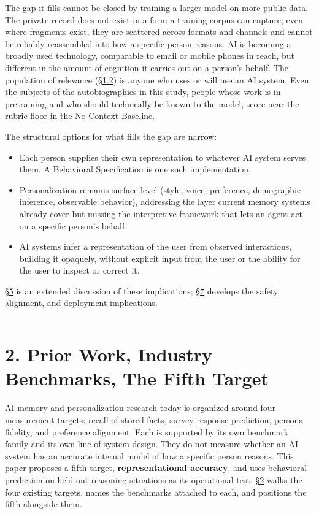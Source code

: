 The gap it fills cannot be closed by training a larger model on more
public data. The private record does not exist in a form a training
corpus can capture; even where fragments exist, they are scattered
across formats and channels and cannot be reliably reassembled into how
a specific person reasons. AI is becoming a broadly used technology,
comparable to email or mobile phones in reach, but different in the
amount of cognition it carries out on a person's behalf. The population
of relevance (\hyperref[what-we-tested]{§1.2}) is anyone who uses or will use an AI system. Even
the subjects of the autobiographies in this study, people whose work is
in pretraining and who should technically be known to the model, score
near the rubric floor in the No-Context Baseline.

The structural options for what fills the gap are narrow:

\begin{itemize}
\tightlist
\item
  Each person supplies their own representation to whatever AI system
  serves them. A Behavioral Specification is one such implementation.
\item
  Personalization remains surface-level (style, voice, preference,
  demographic inference, observable behavior), addressing the layer
  current memory systems already cover but missing the interpretive
  framework that lets an agent act on a specific person's behalf.
\item
  AI systems infer a representation of the user from observed
  interactions, building it opaquely, without explicit input from the
  user or the ability for the user to inspect or correct it.
\end{itemize}

\hyperref[discussion]{§5} is an extended discussion of these implications; \hyperref[future-work]{§7} develops the
safety, alignment, and deployment implications.

\begin{center}\rule{0.5\linewidth}{0.5pt}\end{center}

\hypertarget{prior-work-industry-benchmarks-the-fifth-target}{%
\section{2. Prior Work, Industry Benchmarks, The Fifth
Target}\label{prior-work-industry-benchmarks-the-fifth-target}}

AI memory and personalization research today is organized around four
measurement targets: recall of stored facts, survey-response prediction,
persona fidelity, and preference alignment. Each is supported by its own
benchmark family and its own line of system design. They do not measure
whether an AI system has an accurate internal model of how a specific
person reasons. This paper proposes a fifth target,
\textbf{representational accuracy}, and uses behavioral prediction on
held-out reasoning situations as its operational test. \hyperref[prior-work-industry-benchmarks-the-fifth-target]{§2} walks the four
existing targets, names the benchmarks attached to each, and positions
the fifth alongside them.

